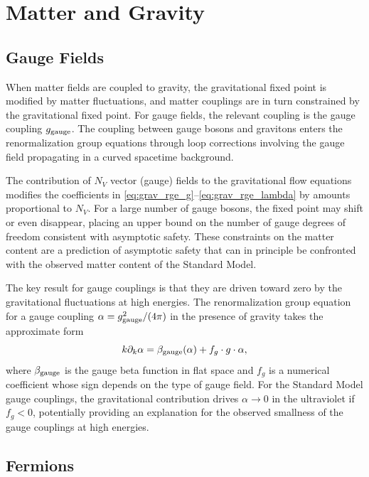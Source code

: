 \documentclass[11pt, twoside, openright]{book}
\theoremstyle{dotted}
\theoremstyle{definition}
\newcommand{\kdk}{k\partial_k}         %
\begin{document}
\chapter{Matter and Gravity}
\label{ch:matter_gravity}

\section{Gauge Fields}

When matter fields are coupled to gravity, the gravitational fixed point is modified
by matter fluctuations, and matter couplings are in turn constrained by the
gravitational fixed point. For gauge fields, the relevant coupling is the gauge
coupling $g_{\rm gauge}$. The coupling between gauge bosons and gravitons enters
the renormalization group equations through loop corrections involving the gauge
field propagating in a curved spacetime background.

The contribution of $N_V$ vector (gauge) fields to the gravitational flow equations
modifies the coefficients in \eqref{eq:grav_rge_g}--\eqref{eq:grav_rge_lambda}
by amounts proportional to $N_V$. For a large number of gauge bosons, the fixed
point may shift or even disappear, placing an upper bound on the number of gauge
degrees of freedom consistent with asymptotic safety. These constraints on the
matter content are a prediction of asymptotic safety that can in principle be
confronted with the observed matter content of the Standard Model.

The key result for gauge couplings is that they are driven toward zero by the
gravitational fluctuations at high energies. The renormalization group equation for
a gauge coupling $\alpha = g_{\rm gauge}^2/(4\pi)$ in the presence of gravity
takes the approximate form
\begin{equation}
  \kdk \alpha = \beta_{\rm gauge}(\alpha) + f_g \cdot g \cdot \alpha,
  \label{eq:gauge_gravity_rge}
\end{equation}
where $\beta_{\rm gauge}$ is the gauge beta function in flat space and $f_g$ is a
numerical coefficient whose sign depends on the type of gauge field. For the
Standard Model gauge couplings, the gravitational contribution drives $\alpha \to 0$
in the ultraviolet if $f_g < 0$, potentially providing an explanation for the
observed smallness of the gauge couplings at high energies.

\section{Fermions}
\end{document}
